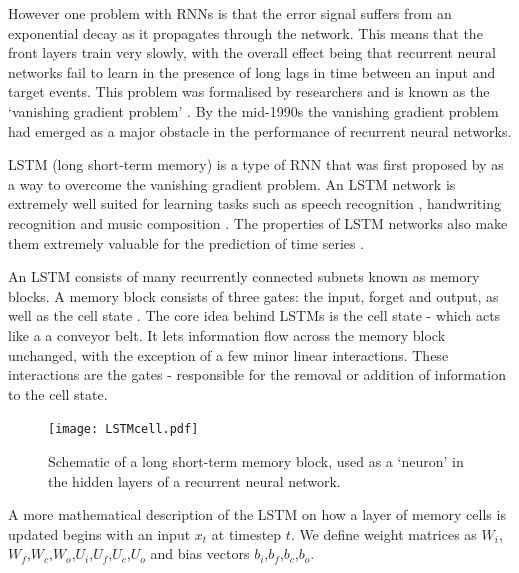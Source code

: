However one problem with RNNs is that the error signal suffers from an exponential decay as it propagates through the network. This means that the front layers train very slowly, with the overall effect being that recurrent neural networks fail to learn in the presence of long lags in time between an input and target events. This problem was formalised by researchers and is known as the `vanishing gradient problem' \cite{hochreiter1991untersuchungen, hochreiter2001gradient}. By the mid-1990s the vanishing gradient problem had emerged as a major obstacle in the performance of recurrent neural networks.

LSTM (long short-term memory) is a type of RNN that was first proposed by \cite{Hochreiter:1997:LSM:1246443.1246450} as a way to overcome the vanishing gradient problem. An LSTM network is extremely well suited for learning tasks such as speech recognition \cite{Graves2005602}, handwriting recognition \cite{graves2008unconstrained} and music composition \cite{eck2002learning}. The properties of LSTM networks also make them extremely valuable for the prediction of time series \cite{gers2001applying}.

An LSTM consists of many recurrently connected subnets known as memory blocks. A memory block consists of three gates: the input, forget and output, as well as the cell state \cite{gers2000learning}. The core idea behind LSTMs is the cell state - which acts like a a conveyor belt. It lets information flow across the memory block unchanged, with the exception of a few minor linear interactions. These interactions are the gates - responsible for the removal or addition of information to the cell state.


\begin{figure}[t]
    \centering
    \texttt{[image: LSTMcell.pdf]}
    \caption[LSTM cell schematic]{Schematic of a long short-term memory block, used as a `neuron' in the hidden layers of a recurrent neural network.}
    \label{fig:lstmcell}
\end{figure}

A more mathematical description of the LSTM on how a layer of memory cells is updated begins with an input $x_t$ at timestep $t$. We define weight matrices as $W_i$,$W_f$,$W_c$,$W_o$,$U_i$,$U_f$,$U_c$,$U_o$ and bias vectors $b_i$,$b_f$,$b_c$,$b_o$.

